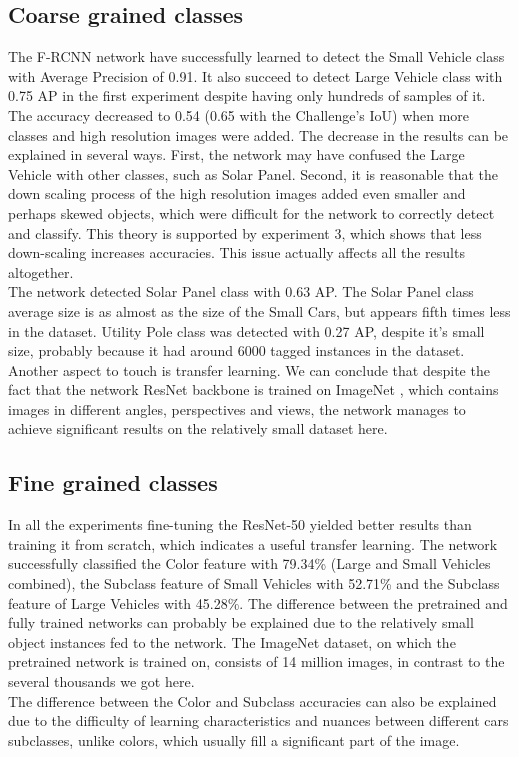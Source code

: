 \documentclass[]{article}
\begin{document}
\subsection{Coarse grained classes}
The F-RCNN \cite{fasterrcnn} network have successfully learned to detect the Small Vehicle class with Average Precision of 0.91. It also succeed to detect Large Vehicle class with 0.75 AP in the first experiment despite having only hundreds of samples of it. The accuracy decreased to 0.54 (0.65 with the Challenge's IoU) when more classes and high resolution images were added. The decrease in the results can be explained in several ways. First, the network may have confused the Large Vehicle with other classes, such as Solar Panel. Second, it is reasonable that the down scaling process of the high resolution images added even smaller and perhaps skewed objects, which were difficult for the network to correctly detect and classify. This theory is supported by experiment 3, which shows that less down-scaling increases accuracies. This issue actually affects all the results altogether.\\
The network detected Solar Panel class with 0.63 AP. The Solar Panel class average size is as almost as the size of the Small Cars, but appears fifth times less in the dataset. Utility Pole class was detected with 0.27 AP, despite it's small size, probably because it had around 6000 tagged instances in the dataset.\\
Another aspect to touch is transfer learning. We can conclude that despite the fact that the network ResNet \cite{resnet} backbone is trained on ImageNet \cite{imagenet}, which contains images in different angles, perspectives and views, the network manages to achieve significant results on the relatively small dataset here.

\subsection{Fine grained classes}
In all the experiments fine-tuning the ResNet-50 \cite{resnet} yielded better results than training it from scratch, which indicates a useful transfer learning.
The network successfully classified the Color feature with 79.34\% (Large and Small Vehicles combined), the Subclass feature of Small Vehicles with 52.71\% and the Subclass feature of Large Vehicles with 45.28\%. The difference between the pretrained and fully trained networks can probably be explained due to the relatively small object instances fed to the network. The ImageNet \cite{imagenet} dataset, on which the pretrained network is trained on, consists of 14 million images, in contrast to the several thousands we got here. \\
The difference between the Color and Subclass accuracies can also be explained due to the difficulty of learning characteristics and nuances between different cars subclasses, unlike colors, which usually fill a significant part of the image.
\end{document}
